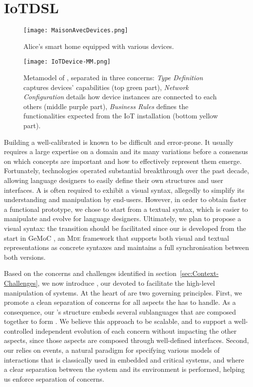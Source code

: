 \section{IoTDSL}
\label{sec:IoTDSL}

\begin{figure}%
\texttt{[image: MaisonAvecDevices.png]}%
\caption{Alice's smart home equipped with various devices.}%
\label{fig:RE}%
\end{figure}

\begin{figure*}%
  \centering  
  \texttt{[image: IoTDevice-MM.png]}%
  \caption{Metamodel of \IOTDSL, separated in three concerns: \emph{Type Definition} captures devices' capabilities (top green part), \emph{Network Configuration} details how device instances are connected to each others (middle purple part), \emph{Business Rules} defines the functionalities expected from the IoT installation (bottom yellow part).}%
  \label{fig:IoTDevice-MM}%
\end{figure*}

Building a well-calibrated \DSL is known to be difficult and error-prone. It usually requires a large expertise on a domain and its many variations before a consensus on which concepts are important and how to effectively represent them emerge. Fortunately, \MDE technologies operated substantial breakthrough over the past decade, allowing language designers to easily define their own \DSL structures and user interfaces. A \DSL is often required to exhibit a visual syntax, allegedly to simplify its understanding and manipulation by end-users. However, in order to obtain faster a functional prototype, we chose to start from a textual syntax, which is easier to manipulate and evolve for language designers. Ultimately, we plan to propose a visual syntax: the transition should be facilitated since our \DSL is developed from the start in GeMoC \cite{Bousse-Degueule-Vojtisek-etAl:2016}, an \textsc{Mde} framework that supports both visual and textual representations as concrete syntaxes and maintains a full synchronisation between both versions.

Based on the concerns and challenges identified in section~\ref{sec:Context-Challenges}, we now introduce \IOTDSL, our \DSL devoted to facilitate the high-level manipulation of \IOT systems. At the heart of \IOTDSL are two governing principles. First, we promote a clean separation of concerns for all aspects the \DSL has to handle. As a consequence, our \DSL's structure embeds several sublanguages that are composed together to form \IOTDSL. We believe this approach to be scalable, and to support a well-controlled independent evolution of each concern without impacting the other aspects, since those aspects are composed through well-defined interfaces. Second, our \DSL relies on events, a natural paradigm for specifying various models of interactions that is classically used in embedded and critical systems, and where a clear separation between the system and its environment is performed, helping us enforce separation of concerns.

